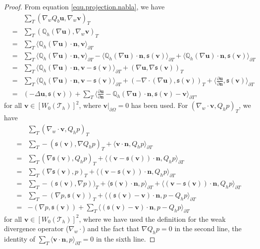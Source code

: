 \documentclass[final,leqno]{siamltex704}
\def\S{{\mathfrak s}}
\def\T{{\mathcal T}}
\begin{document}
\begin{proof}
From equation \eqref{equ.projection.nabla}, we have
\begin{eqnarray}
&&\sum_{T}(\nabla_w Q_b \bm{u},\nabla_w \bm{v})_T\nonumber\\
&=& \sum_{T}(\mathbb{Q}_h(\nabla \bm{u}),\nabla_w \bm{v})_T \label{equ.wg.wf.1}\\
&=& \sum_{T} \langle  \mathbb{Q}_h(\nabla \bm{u})\cdot\bm{n},\bm{v}\rangle_{\partial T} \nonumber\\
&=& \sum_{T} \langle  \mathbb{Q}_h(\nabla \bm{u})\cdot\bm{n},\bm{v}\rangle_{\partial T}-\langle \mathbb{Q}_h(\nabla \bm{u})\cdot\bm{n},\S(\bm{v})\rangle_{\partial T} + \langle \mathbb{Q}_h(\nabla \bm{u})\cdot\bm{n},\S(\bm{v})\rangle_{\partial T} \nonumber\\
&=& \sum_{T} \langle \mathbb{Q}_h(\nabla \bm{u})\cdot\bm{n},\bm{v}-\S(\bm{v})\rangle_{\partial T} +(\nabla \bm{u},\nabla \S(\bm{v}))_{T} \nonumber\\
&=& \sum_{T} \langle \mathbb{Q}_h(\nabla \bm{u})\cdot\bm{n},\bm{v}-\S(\bm{v})\rangle_{\partial T} +(-\nabla \cdot(\nabla \bm{u}) ,\S(\bm{v}))_{T} + \langle \frac{\partial \bm{u}}{\partial \bm{n}},\S(\bm{v})\rangle_{\partial T}\nonumber\\
&=& (-\Delta\bm{u} ,\S( \bm{v}))+ \sum_{T}\langle \frac{\partial \bm{u}}{\partial \bm{n}}- \mathbb{Q}_h(\nabla \bm{u})\cdot\bm{n},\S(\bm{v})-\bm{v}\rangle_{\partial T}, \nonumber
\end{eqnarray}
for all $\bm{v}\in [W_0(\T_h)]^2$, where $\bm{v}|_{\partial\Omega}=0$ has been used. For $(\nabla_w\cdot\bm{v}, Q_h p )_{T}$, we have
\begin{equation}\label{equ.wg.wf.2}
\begin{split}
&\sum_{T}(\nabla_w\cdot\bm{v}, Q_h p )_{T}\\
=& \sum_{T} -(\S(\bm{v}),\nabla Q_h p)_{T} + \langle\bm{v}\cdot \bm{n}, Q_h p \rangle_{\partial T} \\
=& \sum_{T}(\nabla \S(\bm{v}), Q_h p)_{T} + \langle (\bm{v} -\S(\bm{v}))\cdot \bm{n}, Q_h p \rangle_{\partial T} \\
=& \sum_{T}(\nabla \S(\bm{v}),  p)_{T}    + \langle (\bm{v} -\S(\bm{v}))\cdot \bm{n}, Q_h p \rangle_{\partial T}  \\
=& \sum_{T} -( \S(\bm{v}), \nabla p))_{T}  + \langle \S(\bm{v})\cdot \bm{n},p \rangle_{\partial T} + \langle(\bm{v} -\S(\bm{v}))\cdot \bm{n}, Q_h p\rangle_{\partial T} \\
=& \sum_{T}-(\nabla p, \S(\bm{v}))_{T} + \langle (\S(\bm{v})-\bm{v})\cdot \bm{n},p - Q_h p\rangle_{\partial T}\\
=& -(\nabla p, \S(\bm{v})) + \sum_{T} \langle (\S(\bm{v})-\bm{v})\cdot \bm{n},p - Q_h p\rangle_{\partial T}
\end{split}
\end{equation}
for all $\bm{v}\in [W_0(\T_h)]^2$, where we have used the definition for the weak divergence operator ($\nabla_w\cdot$) and the fact that $\nabla Q_h p=0$ in the second line, the identity of $\sum_{T} \langle \bm{v}\cdot \bm{n}, p \rangle_{\partial T} =0$ in the sixth line.


\end{proof}
\end{document}
